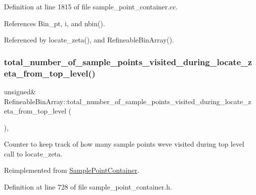 Definition at line 1815 of file sample\+\_\+point\+\_\+container.\+cc.



References Bin\+\_\+pt, i, and nbin().



Referenced by locate\+\_\+zeta(), and Refineable\+Bin\+Array().

\mbox{\label{classRefineableBinArray_a551adefafd0be9d184c4daa6adf16512}} 
\subsubsection{\texorpdfstring{total\+\_\+number\+\_\+of\+\_\+sample\+\_\+points\+\_\+visited\+\_\+during\+\_\+locate\+\_\+zeta\+\_\+from\+\_\+top\+\_\+level()}{total\_number\_of\_sample\_points\_visited\_during\_locate\_zeta\_from\_top\_level()}}
{\footnotesize\ttfamily unsigned\& Refineable\+Bin\+Array\+::total\+\_\+number\+\_\+of\+\_\+sample\+\_\+points\+\_\+visited\+\_\+during\+\_\+locate\+\_\+zeta\+\_\+from\+\_\+top\+\_\+level (\begin{DoxyParamCaption}{ }\end{DoxyParamCaption})\hspace{0.3cm}{\ttfamily [inline]}, {\ttfamily [virtual]}}



Counter to keep track of how many sample points we\textquotesingle{}ve visited during top level call to locate\+\_\+zeta. 



Reimplemented from \hyperlink{classSamplePointContainer_af05aff0424680eec183a5680c4d6d65f}{Sample\+Point\+Container}.



Definition at line 728 of file sample\+\_\+point\+\_\+container.\+h.



